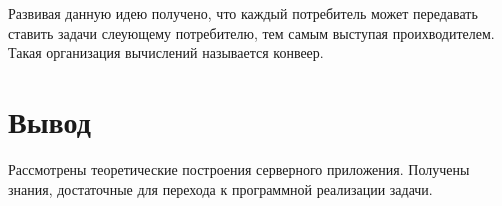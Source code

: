 Развивая данную идею получено, что каждый потребитель может передавать ставить задачи слеующему потребителю, тем самым выступая проихводителем. Такая организация вычислений называется конвеер.

\section*{Вывод}

Рассмотрены теоретические построения серверного приложения. Получены знания, достаточные для перехода к программной реализации задачи.

\clearpage